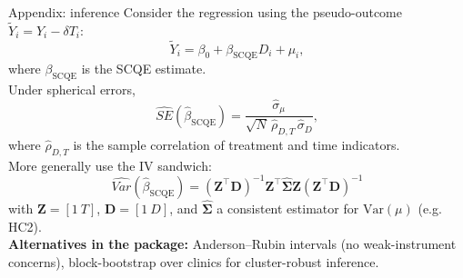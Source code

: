 \documentclass[handout,xcolor=dvipsnames,pdftex,hyperref={colorlinks=false}]{beamer}
\newcommand{\Var}{\mathrm{Var}}
\DeclareMathOperator{\SCQE}{SCQE}
\begin{document}
\begin{frame}{Appendix: inference}
\small
Consider the regression using the pseudo-outcome $\tilde Y_i = Y_i - \delta T_i$:
\[
    \tilde{Y}_i = \beta_0 + \beta_{\SCQE} D_i + \mu_i,
\]
where $\beta_{\SCQE}$ is the SCQE estimate.\\
\medskip
{} Under spherical errors,
\footnotesize
\[
\widehat{SE}(\hat\beta_{\SCQE}) = \frac{\hat\sigma_\mu}{\sqrt{N}\,\hat\rho_{D,T}\,\hat\sigma_D},
\]
\normalsize\small
where $\hat\rho_{D,T}$ is the sample correlation of treatment and time indicators.\\
\medskip
{} More generally use the IV sandwich:
\footnotesize
\[
  \widehat{Var}(\hat\beta_{\SCQE}) = (\mathbf{Z}^\top \mathbf{D})^{-1}\mathbf{Z}^\top \hat{\mathbf{\Sigma}} \mathbf{Z}(\mathbf{Z}^\top \mathbf{D})^{-1}
\]
\normalsize\small
with $\mathbf{Z} = [1\ T]$, $\mathbf{D} = [1\ D]$, and $\hat{\mathbf{\Sigma}}$ a consistent estimator for $\Var(\mu)$ (e.g. HC2).\\
\medskip
{} \textbf{Alternatives in the package:} Anderson--Rubin intervals (no weak-instrument concerns), block-bootstrap over clinics for cluster-robust inference.
\end{frame}
\end{document}
